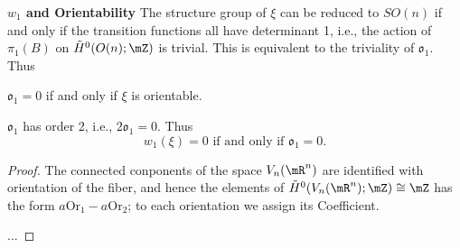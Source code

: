 \noindent\textbf{$w_1$ and Orientability}
The structure group of $\xi$ can be reduced to $SO(n)$ if and only if
the transition functions all have determinant 1, i.e., the action of 
$\pi_1(B)$ on $\tilde{H}^0(O(n);\mZ)$ is trivial. This is equivalent to
the triviality of $\mathfrak{o}_1$. Thus
\begin{proposition}
    $\mathfrak{o}_1 = 0$ if and only if $\xi$ is orientable.
\end{proposition}
\begin{theorem}
    $\mathfrak{o}_1$ has order 2, i.e., $2\mathfrak{o}_1 = 0$. Thus 
    \begin{equation*}
        w_1(\xi) = 0 \text{ if and only if } \mathfrak{o}_1 = 0.
    \end{equation*}
\end{theorem}
\begin{proof}
    The connected conponents of the space $V_n(\mR^n)$ are identified with 
    orientation of the fiber, and hence the elements of 
    $\tilde{H}^0(V_n(\mR^n);\mZ)\cong\mZ$ has the form 
    $a\mathrm{Or}_1-a\mathrm{Or}_2$; to each orientation we assign its 
    Coefficient.
    
    ...
\end{proof}

